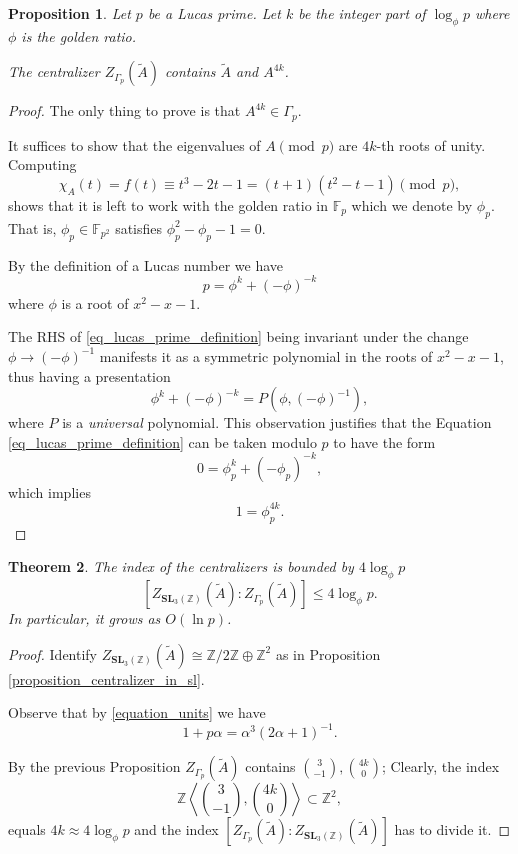 \documentclass[a4paper]{article}
\newtheorem{Thm}{Theorem}[section]
\newtheorem{Prop}[Thm]{Proposition}
\newcommand{\SL}{\mathbf{SL}_3(\mathbb{Z})}        %
\newcommand{\SLp}{\Gamma_p}        %
\newcommand{\phip}{\phi_p}        %
\begin{document}
\begin{Prop}
Let $p$ be a Lucas prime.
Let $k$ be the integer part of $\log_{\phi} p$ where $\phi$ is the golden ratio.

The centralizer $Z_{\SLp}(\tilde A)$ contains $\tilde A$ and $A^{4k}$.
\end{Prop}
\begin{proof}
The only thing to prove is that 
$A^{4k}  \in \SLp$.

It suffices to show that the eigenvalues of $A \pmod p$ are $4k$-th roots of unity.
Computing
\[
\chi_{A}(t) = f(t) \equiv t^3 - 2 t - 1 = (t + 1) (t^2 - t - 1) \pmod p
,\] 
shows that it is left to work with the golden ratio in $\mathbb F_p$ which we denote by $\phip$.
That is, $\phip \in \mathbb F_{p^2}$ satisfies $\phip^2 - \phip - 1 = 0$.


By the definition of a Lucas number we have 
\begin{equation}
	\label{eq_lucas_prime_definition}
p = \phi^k + (-\phi)^{-k} 
\end{equation}
where $\phi$ is a root of $x^2 - x - 1$.

The RHS of \eqref{eq_lucas_prime_definition} being invariant under the change $\phi \to (-\phi)^{-1}$ manifests it as a symmetric polynomial in the roots of $x^2 - x - 1$, thus having a presentation
\[
\phi^k + (-\phi)^{-k} = P( \phi, (-\phi)^{-1})
,\] 
where $P$ is a \emph{universal} polynomial.
This observation justifies that the Equation \eqref{eq_lucas_prime_definition} can be taken modulo $p$ to have the form
\[
0 = \phip^k + (-\phip)^{-k} 
,\] 
which implies 
\[
1 = \phip^{4k} 
.\] 
\end{proof}

\begin{Thm}
	The index of the centralizers is bounded by $4 \log_{\phi} p$
\[
	[Z_{\SL}(\tilde A) : Z_{\SLp}(\tilde A)] \le 4 \log_{\phi} p
.\] 
In particular, it grows as $O(\ln p)$.
\end{Thm}
\begin{proof}
Identify $Z_{\SL}(\tilde A) \cong \mathbb{Z}/2\mathbb{Z} \oplus \mathbb{Z}^2$ as in Proposition \ref{proposition_centralizer_in_sl}.

Observe that by \eqref{equation_units} we have
\[
1 + p \alpha = \alpha^3 (2 \alpha + 1)^{-1} 
.\] 

By the previous Proposition 
$Z_{\SLp}(\tilde A)$ contains $\binom{3}{-1}, \binom{4k}{0}$;
Clearly, the index
\[
\mathbb{Z} \left< \binom{3}{-1}, \binom{4k}{0}\right> \subset \mathbb{Z}^2
,\] 
equals $4k \approx 4 \log_{\phi} p$ and the index 
$ [Z_{\SLp}(\tilde A) : Z_{\SL}(\tilde A)]$
has to divide it.
\end{proof}




\end{document}
